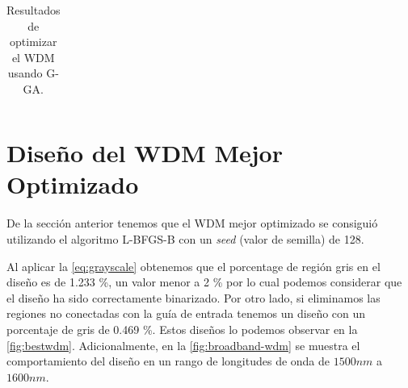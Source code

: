 \begin{landscape}
\begin{table}[ht]
\begin{tabular}{|c|c|c|c|}
    \hline
    \end{tabular}
    \hspace*{-5cm}
    \caption{Resultados de optimizar el WDM usando G-GA.}
    \label{tab:opt-GA-wdm}
\end{table}
\end{landscape}

\section{Diseño del WDM Mejor Optimizado}\label{sec:best-wdm}

De la sección anterior tenemos que el WDM mejor optimizado se consiguió
utilizando el algoritmo L-BFGS-B con un \emph{seed} (valor de semilla) de 128.

Al aplicar la \autoref{eq:grayscale} obtenemos que el porcentage de región gris en el diseño
es de 1.233 \%, un valor menor a 2 \% por lo cual podemos considerar que el diseño ha sido
correctamente binarizado. Por otro lado, si eliminamos las regiones no conectadas con la guía de entrada
tenemos un diseño con un porcentaje de gris de 0.469 \%.
Estos diseños lo podemos observar en la \autoref{fig:bestwdm}.
Adicionalmente, en la \autoref{fig:broadband-wdm} se muestra el comportamiento del diseño
en un rango de longitudes de onda de $1500nm$ a $1600 nm$.

